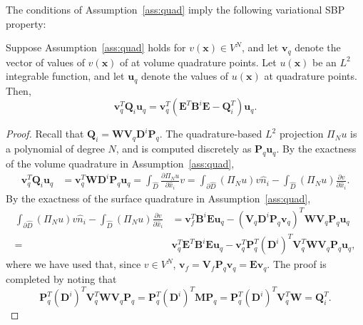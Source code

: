 \documentclass{svjour3}                     %
\renewcommand{\hat}{\widehat}
\newcommand{\pd}[2]{\frac{\partial#1}{\partial#2}}
\newcommand{\LRp}[1]{\left( #1 \right)}
\begin{document}

The conditions of Assumption~\ref{ass:quad} imply the following variational SBP property:
\begin{lemma}
\label{lemma:vsbp}
Suppose Assumption~\ref{ass:quad} holds for $v(\bm{x})\in V^N$, and let $\bm{v}_q$ denote the vector of values of $v(\bm{x})$ of at volume quadrature points. Let $u(\bm{x})$ be an $L^2$ integrable function, and let $\bm{u}_q$ denote the values of $u(\bm{x})$ at quadrature points.  Then, 
\[
\bm{v}_q^T\bm{Q}_i \bm{u}_q = \bm{v}_q^T\LRp{ {\bm{E}}^T \bm{B}^i\bm{E} - \bm{Q}_i^T}\bm{u}_q.
\]
\end{lemma}
\begin{proof}
Recall that $\bm{Q}_i = \bm{W} \bm{V}_q \bm{D}^i\bm{P}_q$.  The quadrature-based $L^2$ projection $\Pi_Nu$ is a polynomial of degree $N$, and is computed discretely as $\bm{P}_q\bm{u}_q$.  By the exactness of the volume quadrature in Assumption~\ref{ass:quad}, 
\begin{align*}
\bm{v}_q^T\bm{Q}_i \bm{u}_q &= \bm{v}_q^T\bm{W} \bm{D}^i \bm{P}_q \bm{u}_q = \int_{\hat{D}} \pd{\Pi_N u}{\hat{x}_i} v = \int_{\partial \hat{D}} (\Pi_N u) v \hat{n}_i - \int_{\hat{D}} \LRp{\Pi_N u} \pd{v}{\hat{x}_i}.
\end{align*}
By the exactness of the surface quadrature in Assumption~\ref{ass:quad}, 
\begin{align*}
\int_{\partial \hat{D}} (\Pi_N u) v \hat{n}_i -   \int_{\hat{D}} \LRp{\Pi_N u} \pd{v}{\hat{x}_i} &=\bm{v}_f^T\bm{B}^i \bm{E}\bm{u}_q - \LRp{\bm{V}_q\bm{D}^i\bm{P}_q\bm{v}_q}^T\bm{W} \bm{V}_q\bm{P}_q\bm{u}_q\\
=& \bm{v}_q^T {\bm{E}}^T\bm{B}^i \bm{E}\bm{u}_q - \bm{v}_q^T \bm{P}_q^T\LRp{\bm{D}^i}^T \bm{V}_q^T \bm{W} \bm{V}_q\bm{P}_q\bm{u}_q,
\end{align*}
where we have used that, since $v \in V^N$, $\bm{v}_f = \bm{V}_f\bm{P}_q\bm{v}_q = \bm{E}\bm{v}_q$.  The proof is completed by noting that 
\[
\bm{P}_q^T\LRp{\bm{D}^i}^T \bm{V}_q^T \bm{W} \bm{V}_q\bm{P}_q = \bm{P}_q^T\LRp{\bm{D}^i}^T \bm{M}\bm{P}_q = \bm{P}_q^T\LRp{\bm{D}^i}^T \bm{V}_q^T\bm{W} = \bm{Q}_i^T.
\]
\end{proof}
\end{document}
